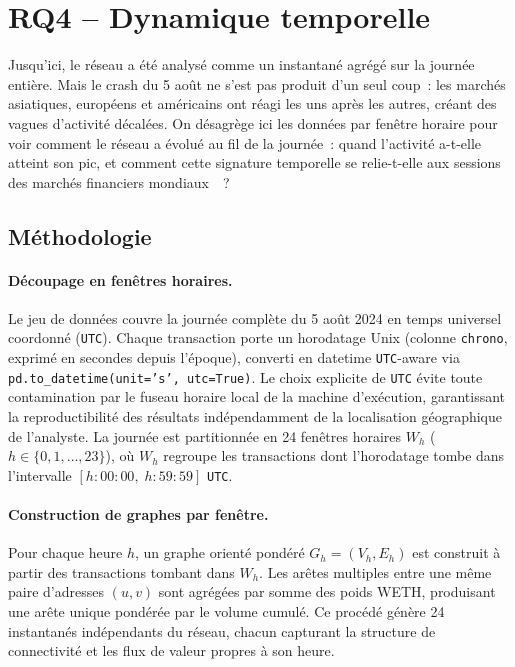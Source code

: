 
\section{RQ4 -- Dynamique temporelle}
\label{sec:rq4}

Jusqu'ici, le r\'eseau a \'et\'e analys\'e comme un instantan\'e agr\'eg\'e sur la journ\'ee enti\`ere. Mais le crash du 5 ao\^ut ne s'est pas produit d'un seul coup~: les march\'es asiatiques, europ\'eens et am\'ericains ont r\'eagi les uns apr\`es les autres, cr\'eant des vagues d'activit\'e d\'ecal\'ees. On d\'esagr\`ege ici les donn\'ees par fen\^etre horaire pour voir comment le r\'eseau a \'evolu\'e au fil de la journ\'ee~: quand l'activit\'e a-t-elle atteint son pic, et comment cette signature temporelle se relie-t-elle aux sessions des march\'es financiers mondiaux~\cite{newman2018networks}~?

\subsection{M\'ethodologie}
\label{sec:rq4_methodo}

\paragraph{D\'ecoupage en fen\^etres horaires.}
Le jeu de donn\'ees couvre la journ\'ee compl\`ete du 5 ao\^ut 2024 en temps universel coordonn\'e (\texttt{UTC}). Chaque transaction porte un horodatage Unix (colonne \texttt{chrono}, exprim\'e en secondes depuis l'\'epoque), converti en datetime \texttt{UTC}-aware via \texttt{pd.to\_datetime(unit='s', utc=True)}. Le choix explicite de \texttt{UTC} \'evite toute contamination par le fuseau horaire local de la machine d'ex\'ecution, garantissant la reproductibilit\'e des r\'esultats ind\'ependamment de la localisation g\'eographique de l'analyste. La journ\'ee est partitionn\'ee en 24 fen\^etres horaires $W_h$ ($h \in \{0, 1, \ldots, 23\}$), o\`u $W_h$ regroupe les transactions dont l'horodatage tombe dans l'intervalle $[h{:}00{:}00,\; h{:}59{:}59]$ \texttt{UTC}.

\paragraph{Construction de graphes par fen\^etre.}
Pour chaque heure $h$, un graphe orient\'e pond\'er\'e $G_h = (V_h, E_h)$ est construit \`a partir des transactions tombant dans $W_h$. Les ar\^etes multiples entre une m\^eme paire d'adresses $(u, v)$ sont agr\'eg\'ees par somme des poids WETH, produisant une ar\^ete unique pond\'er\'ee par le volume cumul\'e. Ce proc\'ed\'e g\'en\`ere 24 instantan\'es ind\'ependants du r\'eseau, chacun capturant la structure de connectivit\'e et les flux de valeur propres \`a son heure.

